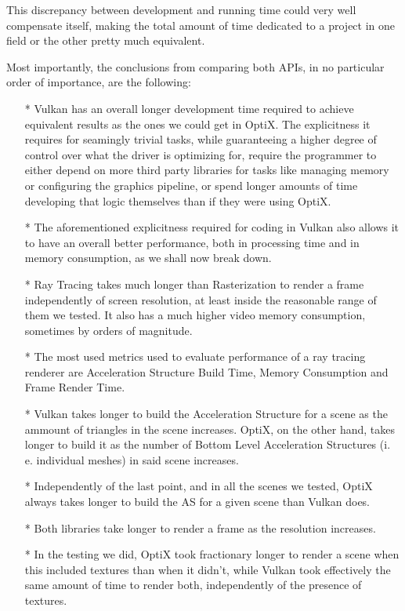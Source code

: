This discrepancy between development and running time could very well compensate itself, making the total amount of time dedicated to a project in one field or the other pretty much equivalent.

Most importantly, the conclusions from comparing both APIs, in no particular order of importance, are the following:
\begin{itemize}
  \item[*]{Vulkan has an overall longer development time required to achieve equivalent results as the ones we could get in OptiX. The explicitness it requires for seamingly trivial tasks, while guaranteeing a higher degree of control over what the driver is optimizing for, require the programmer to either depend on more third party libraries for tasks like managing memory or configuring the graphics pipeline, or spend longer amounts of time developing that logic themselves than if they were using OptiX.}
  \item[*]{The aforementioned explicitness required for coding in Vulkan also allows it to have an overall better performance, both in processing time and in memory consumption, as we shall now break down.}
  \item[*]{Ray Tracing takes much longer than Rasterization to render a frame independently of screen resolution, at least inside the reasonable range of them we tested. It also has a much higher video memory consumption, sometimes by orders of magnitude.}
  \item[*]{The most used metrics used to evaluate performance of a ray tracing renderer are Acceleration Structure Build Time, Memory Consumption and Frame Render Time.}
  \item[*]{Vulkan takes longer to build the Acceleration Structure for a scene as the ammount of triangles in the scene increases. OptiX, on the other hand, takes longer to build it as the number of Bottom Level Acceleration Structures (i. e. individual meshes) in said scene increases.}
  \item[*]{Independently of the last point, and in all the scenes we tested, OptiX always takes longer to build the AS for a given scene than Vulkan does.}
  \item[*]{Both libraries take longer to render a frame as the resolution increases.}
  \item[*]{In the testing we did, OptiX took fractionary longer to render a scene when this included textures than when it didn't, while Vulkan took effectively the same amount of time to render both, independently of the presence of textures.}

\end{itemize}
